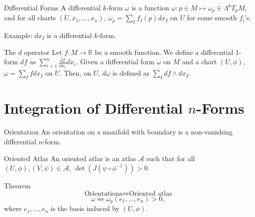 \documentclass[9pt]{beamer}
\DeclareMathOperator{\Det}{det}
\begin{document}
\begin{frame}
    \begin{block}{Differential Forms}
        A differential $k$-form $\omega$ is a function $\omega: p\in M \mapsto \omega_p\in\Lambda^kT_pM$, and for all charts $(U, x_1, \dots, x_n)$, $\omega_p=\sum_I f_I(p)dx_I$ on $U$ for some smooth $f_i$'s.
    \end{block}

    Example: $dx_I$ is a differential $k$-form.

    \begin{block}{The $d$ operator}
        Let $f:M\rightarrow \mathbb{R}$ be a smooth function. We define a differential 1-form $df$ as $\sum_{i=1}^n \frac{\partial f}{\partial x_i}dx_i$.
        Given a differential form $\omega$ on $M$ and a chart $(U, \phi)$, $\omega=\sum_I f dx_I$ on $U$. Then, on $U$, $d\omega$ is defined as $\sum_I df\wedge dx_I$.
    \end{block}

\end{frame}

\section{Integration of Differential \texorpdfstring{$n$}{n}-Forms}
\begin{frame}
    \begin{block}{Orientation}
        An orientation on a manifold with boundary is a non-vanishing differential $n$-form.
    \end{block}

    \begin{block}{Oriented Atlas}
        An oriented atlas is an atlas $\mathcal{A}$ such that for all $(U, \phi),(V, \psi)\in \mathcal{A}$, $\Det(J(\psi\circ\phi ^{-1}))>0$.
    \end{block}

    \begin{block}{Theorem}
        \[\text{Orientations} \iff \text{Oriented atlas}\]
        \[ \omega \iff \omega_p(e_1,\dots,e_n)>0,\] where $e_1,\dots,e_n$ is the basis induced by $(U, \phi)$.
    \end{block}
\end{frame}
\end{document}
